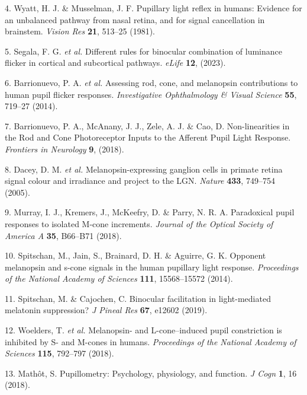 \documentclass[
]{article}
\begin{document}
\leavevmode\hypertarget{ref-Wyatt1981}{}%
4. Wyatt, H. J. \& Musselman, J. F. Pupillary light reflex in humans: Evidence for an unbalanced pathway from nasal retina, and for signal cancellation in brainstem. \emph{Vision Res} \textbf{21}, 513--25 (1981).

\leavevmode\hypertarget{ref-Segala2023}{}%
5. Segala, F. G. \emph{et al.} Different rules for binocular combination of luminance flicker in cortical and subcortical pathways. \emph{eLife} \textbf{12}, (2023).

\leavevmode\hypertarget{ref-Barrionuevo2014}{}%
6. Barrionuevo, P. A. \emph{et al.} Assessing rod, cone, and melanopsin contributions to human pupil flicker responses. \emph{Investigative Ophthalmology \& Visual Science} \textbf{55}, 719--27 (2014).

\leavevmode\hypertarget{ref-Barrionuevo2018}{}%
7. Barrionuevo, P. A., McAnany, J. J., Zele, A. J. \& Cao, D. Non-linearities in the Rod and Cone Photoreceptor Inputs to the Afferent Pupil Light Response. \emph{Frontiers in Neurology} \textbf{9}, (2018).

\leavevmode\hypertarget{ref-Dacey2005}{}%
8. Dacey, D. M. \emph{et al.} Melanopsin-expressing ganglion cells in primate retina signal colour and irradiance and project to the LGN. \emph{Nature} \textbf{433}, 749--754 (2005).

\leavevmode\hypertarget{ref-Murray2018}{}%
9. Murray, I. J., Kremers, J., McKeefry, D. \& Parry, N. R. A. Paradoxical pupil responses to isolated M-cone increments. \emph{Journal of the Optical Society of America A} \textbf{35}, B66--B71 (2018).

\leavevmode\hypertarget{ref-Spitschan2014}{}%
10. Spitschan, M., Jain, S., Brainard, D. H. \& Aguirre, G. K. Opponent melanopsin and s-cone signals in the human pupillary light response. \emph{Proceedings of the National Academy of Sciences} \textbf{111}, 15568--15572 (2014).

\leavevmode\hypertarget{ref-Spitschan2019}{}%
11. Spitschan, M. \& Cajochen, C. Binocular facilitation in light-mediated melatonin suppression? \emph{J Pineal Res} \textbf{67}, e12602 (2019).

\leavevmode\hypertarget{ref-Woelders2018}{}%
12. Woelders, T. \emph{et al.} Melanopsin- and L-cone--induced pupil constriction is inhibited by S- and M-cones in humans. \emph{Proceedings of the National Academy of Sciences} \textbf{115}, 792--797 (2018).

\leavevmode\hypertarget{ref-Mathot2018}{}%
13. Mathôt, S. Pupillometry: Psychology, physiology, and function. \emph{J Cogn} \textbf{1}, 16 (2018).
\end{document}
